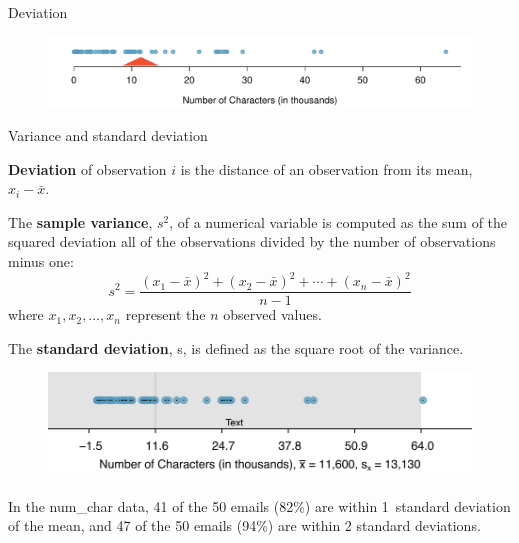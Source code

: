\documentclass[12pt,a4paper]{beamer}
\begin{document}
\begin{frame}{Deviation}
\begin{figure}[h]
	   \centering
	   \includegraphics[width=\textwidth]{figures/emailCharactersDotPlot/emailCharactersDotPlot}
	   \label{emailCharactersDotPlot}
	\end{figure}
\end{frame}

\begin{frame}{Variance and standard deviation}
\small	\begin{framed}
	\textbf{Deviation} of observation $i$ is the distance of an observation from its mean, $x_i-\bar{x}$.
	\end{framed}
	
	\begin{framed}
		The \textbf{sample variance}, $s^2$, of a numerical variable is computed as the sum of the squared deviation all of the observations divided by the number of observations minus one:
		\begin{equation*}
		s^2 = \frac{(x_1-\bar{x})^2+(x_2-\bar{x})^2+\cdots+(x_n-\bar{x})^2}{n-1}
		\end{equation*}
		where $x_1, x_2, \dots, x_n$ represent the $n$ observed values.
		\end{framed}
		
		\begin{framed}
	The \textbf{standard deviation}, s, is defined as the square root of the variance.
	\end{framed}
\end{frame}
\begin{frame}
	\begin{figure}
	\centering
	\includegraphics[width=\textwidth]{figures/sdAsRuleForEmailNumChar/sdAsRuleForEmailNumChar}
	
	\label{sdAsRuleForEmailNumChar}
	\end{figure}
	In the num\_\hspace{0.3mm}char data, 41 of the 50 emails (82\%) are within 1~standard deviation of the mean, and 47 of the 50 emails (94\%) are within 2 standard deviations.
\end{frame}
\end{document}
